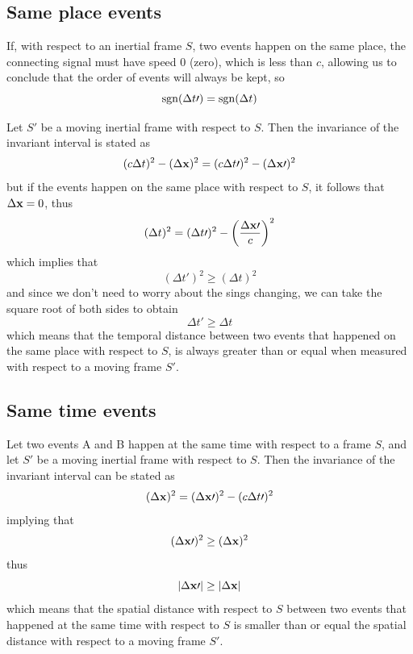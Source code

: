 \documentclass[oneside, 10pt, notitlepage]{book}
\begin{document}
\subsection{Same place events}

If, with respect to an inertial frame \(S\), two events happen on the same place, the connecting signal must have speed \(0\) (zero), which is less than \(c\), allowing us to conclude that the order of events will always be kept, so 
\begin{equation}\operatorname{sgn}(\Delta t{\prime}) = \operatorname{sgn}(\Delta t)\end{equation}
  

Let \(S{\prime}\) be a moving inertial frame with respect to \(S\). Then the invariance of the invariant interval is stated as 
\begin{equation}(c\Delta t)^2 - (\Delta \vb{x})^2 = (c\Delta t{\prime})^2 - (\Delta \vb{x}{\prime})^2\end{equation}
but if the events happen on the same place with respect to \(S\), it follows that \(\Delta \vb{x} = 0\), thus 
\begin{equation}(\Delta t)^2 = (\Delta t{\prime})^2 - \left(\frac{\Delta \vb{x}{\prime}}{c}\right)^2\end{equation}
which implies that
\begin{equation}(\Delta t{\prime})^2 \geq (\Delta t)^2\end{equation}
and since we don't need to worry about the sings changing, we can take the square root of both sides to obtain
\begin{equation}\Delta t{\prime} \geq \Delta t\end{equation}
which means that the temporal distance between two events that happened on the same place with respect to \(S\), is always greater than or equal when measured with respect to a moving frame \(S{\prime}\).  


\subsection{Same time events}

Let two events A and B happen at the same time with respect to a frame \(S\), and let \(S{\prime}\) be a moving inertial frame with respect to \(S\). Then the invariance of the invariant interval can be stated as 
\begin{equation}(\Delta \vb{x})^2 = (\Delta \vb{x}{\prime})^2 -(c\Delta t{\prime})^2\end{equation}
implying that
\begin{equation} (\Delta \vb{x}{\prime})^2 \geq (\Delta \vb{x})^2\end{equation}
thus 
\begin{equation}\abs{\Delta \vb{x}{\prime}} \geq \abs{\Delta \vb{x}}\end{equation}
which means that the spatial distance with respect to \(S\) between two events that happened at the same time with respect to \(S\) is smaller than or equal the spatial distance with respect to a moving frame \(S{\prime}\).  
\end{document}
